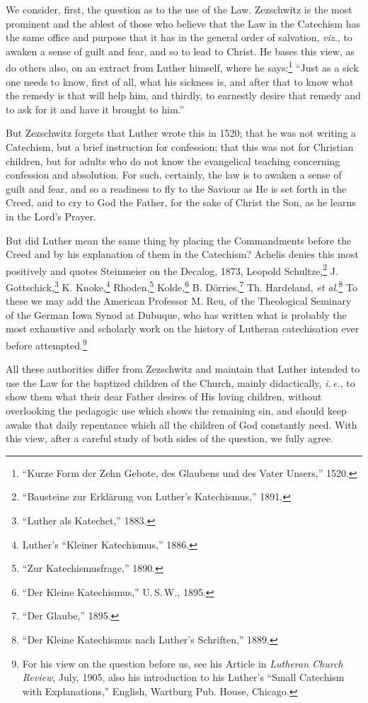  We consider, first, the question as to the use of the Law. Zezschwitz is the most prominent and the ablest of those who believe that the Law in the Catechism has the same office and purpose that it has in the general order of salvation, \emph{viz.}, to awaken a sense of guilt and fear, and so to lead to Christ. He bases this view, as do others also, on an extract from Luther himself, where he says:\footnote{“Kurze Form der Zehn Gebote, des Glaubens und des Vater Unsers,” 1520.} “Just as a sick one needs to know, first of all, what his sickness is, and after that to know what the remedy is that will help him, and thirdly, to earnestly desire that remedy and to ask for it and have it brought to him.”

But Zezschwitz forgets that Luther wrote this in
1520; that he was not writing a Catechism, but a brief instruction for confession; that this was not for Christian children, but for adults who do not know the evangelical teaching concerning confession and absolution. For such, certainly, the law is to awaken a sense of guilt and fear, and so a readiness to fly to the Saviour as He is set forth in the Creed, and to cry to God the Father, for the sake of Christ the Son, as he learns in the Lord’s Prayer.

But did Luther mean the same thing by placing the Commandments before the Creed and by his explanation of them in the Catechism? Achelis denies this most positively and quotes Steinmeier on the Decalog, 1873, Leopold Schultze,\footnote{“Bausteine zur Erklärung von Luther’s Katechismus,” 1891.} J. Gottschick,\footnote{“Luther als Katechet,” 1883.} K. Knoke,\footnote{Luther’s “Kleiner Katechismus,” 1886.} Rhoden,\footnote{“Zur Katechismusfrage,” 1890.} Kolde,\footnote{“Der Kleine Katechismus,” U.\,S.\,W., 1895.} B. Dörries,\footnote{“Der Glaube,” 1895.} Th. Hardeland, \emph{et al.}\footnote{“Der Kleine Katechismus nach Luther’s Schriften,” 1889.} To these we may add the American Professor M. Reu, of the Theological Seminary of the German Iowa Synod at Dubuque, who has written what is probably the most exhaustive and scholarly work on the history of Lutheran catechisation ever before attempted.\footnote{For his view on the question before us, see his Article in \emph{Lutheran Church Review}, July, 1905, also his introduction to his Luther’s “Small Catechism with Explanations,” English, Wartburg Pub. House, Chicago.}

 All these authorities differ from Zezschwitz and maintain that Luther intended to use the Law for the baptized children of the Church, mainly didactically, \emph{i.\,e.}, to show them what their dear Father desires of His loving children, without overlooking the pedagogic use which shows the remaining sin, and should keep awake that daily repentance which all the children of God constantly need. With this view, after a careful study of both sides of the question, we fully agree.


